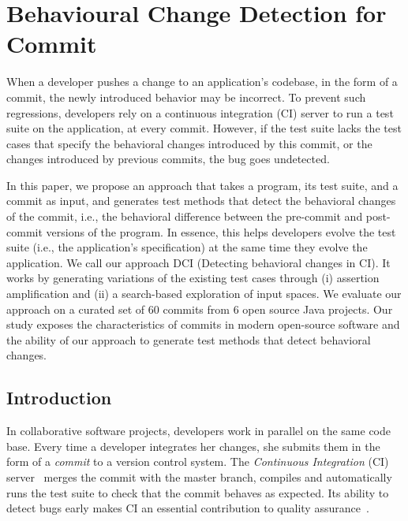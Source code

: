 \chapter{Behavioural Change Detection for Commit}

\begin{center}
	\begin{mdframed}
		\large
	When a developer pushes a change to an application's codebase, in the form of a commit, the newly introduced behavior may be incorrect. To prevent such regressions, developers rely on a continuous integration (CI) server to run a test suite on the application, at every commit. However, if the test suite lacks the test cases that specify the behavioral changes introduced by this commit, or the changes introduced by previous commits, the bug goes undetected.
	
	In this paper, we propose an approach that takes a program, its test suite, and a commit as input, and generates test methods that detect the behavioral changes of the commit, i.e., the behavioral difference between the pre-commit and post-commit versions of the program.
	In essence, this helps developers evolve the test suite (i.e., the application's specification) at the same time they evolve the application.
	We call our approach DCI (Detecting behavioral changes in CI). It works by generating variations of the existing test cases through (i) assertion amplification and (ii) a search-based exploration of input spaces. 
	We evaluate our approach on a curated set of 60 commits from 6 open source Java projects. 
	Our study exposes the characteristics of commits in modern open-source software and the ability of our approach to generate test methods that detect behavioral changes.
	\end{mdframed}
\end{center}

\graphicspath{{.}{chapitres/behavioral-change-detection-for-commit/}}

\minitoc

\section{Introduction}

In collaborative software projects,
developers work in parallel on the same code base. Every time a developer integrates her changes, she submits them in the form of a \emph{commit} to a version control system.
The \emph{Continuous Integration} (CI) server~\cite{fowler2006continuous} merges the commit with the master branch, compiles and automatically runs the test suite to check that the commit behaves as expected.
Its ability to detect bugs early makes CI an essential contribution to quality assurance~\cite{Hilton:2016:UsageCI,duvall2007continuous}.

